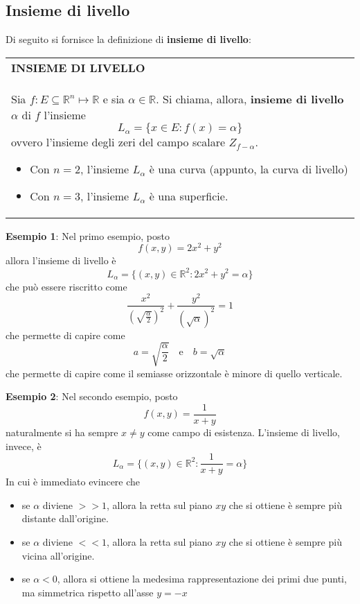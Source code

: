 \documentclass[a4paper]{extarticle}
\renewcommand\arraystretch{}
\begin{document}
\vspace{1em}
\noindent
\subsection{Insieme di livello}
Di seguito si fornisce la definizione di \textbf{insieme di livello}:

\vspace{1em}
\setlength{\tabcolsep}{14pt}
\renewcommand{\arraystretch}{2}
\noindent
\begin{tabularx}{\textwidth}{@{}|P|@{}}
    \hline
    {\textbf{INSIEME DI LIVELLO}}\\
    \parbox{\linewidth}{Sia $f : E \subseteq \mathbb{R}^n \longmapsto \mathbb{R}$ e sia $\alpha \in \mathbb{R}$. Si chiama, allora, \textbf{insieme di livello} $\alpha$ di $f$ l'insieme
    \[\boxed{L_\alpha = \{x \in E : f(x)=\alpha\}}\]
    ovvero l'insieme degli zeri del campo scalare $Z_{f-\alpha}$.
    \begin{itemize}
        \item Con $n=2$, l'insieme $L_\alpha$ è una curva (appunto, la curva di livello)
        \item Con $n=3$, l'insieme $L_\alpha$ è una superficie.
    \end{itemize}
    \vspace{1mm}}\\
    \hline
\end{tabularx}

\vspace{2em}
\noindent
\textbf{Esempio 1}: Nel primo esempio, posto
\[f(x,y)=2x^2+y^2\]
allora l'insieme di livello è
\[L_\alpha = \{(x,y) \in \mathbb{R}^2 : 2x^2+y^2=\alpha\}\]
che può essere riscritto come
\[\frac{x^2}{\left(\sqrt{\frac{\alpha}{2}} \right)^2} + \frac{y^2}{(\sqrt{\alpha})^2}=1\]
che permette di capire come
\[a=\sqrt{\frac{\alpha}{2}} \hspace{1em} \text{e} \hspace{1em} b=\sqrt{\alpha}\]
che permette di capire come il semiasse orizzontale è minore di quello verticale.

\vspace{2em}
\noindent
\textbf{Esempio 2}: Nel secondo esempio, posto
\[f(x,y)=\frac{1}{x+y}\]
naturalmente si ha sempre $x \neq y$ come campo di esistenza. L'insieme di livello, invece, è
\[L_\alpha = \{(x,y) \in \mathbb{R}^2 : \frac{1}{x+y}=\alpha\}\]
In cui è immediato evincere che
\begin{itemize}
    \item se $\alpha$ diviene $>>1$, allora la retta sul piano $xy$ che si ottiene è sempre più distante dall'origine.
    \item se $\alpha$ diviene $<<1$, allora la retta sul piano $xy$ che si ottiene è sempre più vicina all'origine.
    \item se $\alpha<0$, allora si ottiene la medesima rappresentazione dei primi due punti, ma simmetrica rispetto all'asse $y=-x$ 
\end{itemize}
\end{document}
